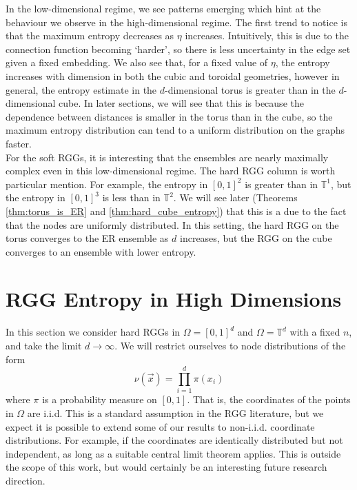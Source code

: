 \documentclass{article}
\newcommand{\tti}{\rightarrow\infty}
\begin{document}
In the low-dimensional regime, we see patterns emerging which hint at the behaviour we observe in the high-dimensional regime. The first trend to notice is that the maximum entropy decreases as $\eta$ increases. Intuitively, this is due to the connection function becoming `harder', so there is less uncertainty in the edge set given a fixed embedding. We also see that, for a fixed value of $\eta$, the entropy increases with dimension in both the cubic and toroidal geometries, however in general, the entropy estimate in the $d$-dimensional torus is greater than in the $d$-dimensional cube. In later sections, we will see that this is because the dependence between distances is smaller in the torus than in the cube, so the maximum entropy distribution can tend to a uniform distribution on the graphs faster. \\

 For the soft RGGs, it is interesting that the ensembles are nearly maximally complex even in this low-dimensional regime. The hard RGG column is worth particular mention. For example, the entropy in $[0,1]^2$ is greater than in $\mathbb{T}^1$, but the entropy in $[0,1]^3$ is less than in $\mathbb{T}^2$. We will see later (Theorems \ref{thm:torus_is_ER} and \ref{thm:hard_cube_entropy}) that this is a due to the fact that the nodes are uniformly distributed. In this setting, the hard RGG on the torus converges to the ER ensemble as $d$ increases, but the RGG on the cube converges to an ensemble with lower entropy. 


\section{RGG Entropy in High Dimensions}
In this section we consider hard RGGs in $\Omega = [0,1]^d$ and $\Omega = \mathbb{T}^d$ with a fixed $n$, and take the limit $d\tti$. We will restrict ourselves to node distributions of the form
\begin{equation}
    \label{eq:general_distribution}
    \nu(\vec{x}) = \prod_{i=1}^d \pi(x_i)
\end{equation}
where $\pi$ is a probability measure on $[0,1]$. That is, the coordinates of the points in $\Omega$ are i.i.d.  This is a standard assumption in the RGG literature, but we expect it is possible to extend some of our results to non-i.i.d. coordinate distributions. For example, if the coordinates are identically distributed but not independent, as long as a suitable central limit theorem applies. This is outside the scope of this work, but would certainly be an interesting future research direction. 
\end{document}

